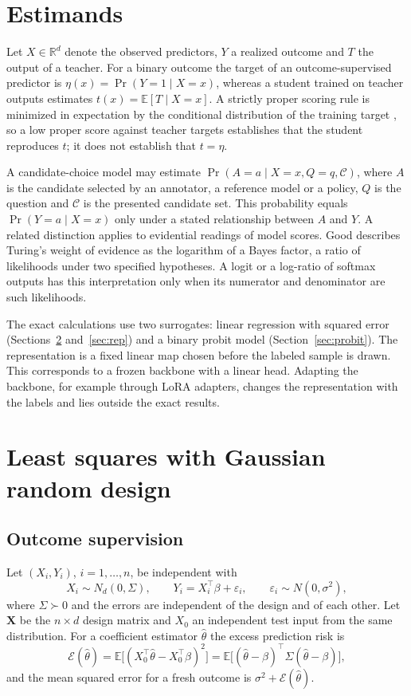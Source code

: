 \documentclass[11pt]{article}
\theoremstyle{remark}
\newcommand{\E}{\mathbb E}
\newcommand{\R}{\mathbb R}
\newcommand{\1}{\mathbf 1}
\begin{document}
\section{Estimands}\label{sec:estimands}
Let $X\in\R^d$ denote the observed predictors, $Y$ a realized outcome and $T$ the output of a teacher. For a binary outcome the target of an outcome-supervised predictor is $\eta(x)=\Pr(Y=1\mid X=x)$, whereas a student trained on teacher outputs estimates $t(x)=\E[T\mid X=x]$. A strictly proper scoring rule is minimized in expectation by the conditional distribution of the training target \cite{gneiting}, so a low proper score against teacher targets establishes that the student reproduces $t$; it does not establish that $t=\eta$.

A candidate-choice model may estimate $\Pr(A=a\mid X=x,Q=q,\mathcal C)$, where $A$ is the candidate selected by an annotator, a reference model or a policy, $Q$ is the question and $\mathcal C$ is the presented candidate set. This probability equals $\Pr(Y=a\mid X=x)$ only under a stated relationship between $A$ and $Y$. A related distinction applies to evidential readings of model scores. Good \cite{good} describes Turing's weight of evidence as the logarithm of a Bayes factor, a ratio of likelihoods under two specified hypotheses. A logit or a log-ratio of softmax outputs has this interpretation only when its numerator and denominator are such likelihoods.

The exact calculations use two surrogates: linear regression with squared error (Sections~\ref{sec:regression} and~\ref{sec:rep}) and a binary probit model (Section~\ref{sec:probit}). The representation is a fixed linear map chosen before the labeled sample is drawn. This corresponds to a frozen backbone with a linear head. Adapting the backbone, for example through LoRA adapters, changes the representation with the labels and lies outside the exact results.

\section{Least squares with Gaussian random design}\label{sec:regression}
\subsection{Outcome supervision}
Let $(X_i,Y_i)$, $i=1,\ldots,n$, be independent with
\begin{equation}\label{eq:dgp}
 X_i\sim N_d(0,\Sigma),\qquad Y_i=X_i^\top\beta+\varepsilon_i,
 \qquad \varepsilon_i\sim N(0,\sigma^2),
\end{equation}
where $\Sigma\succ0$ and the errors are independent of the design and of each other. Let $\mathbf X$ be the $n\times d$ design matrix and $X_0$ an independent test input from the same distribution. For a coefficient estimator $\widehat\theta$ the excess prediction risk is
\begin{equation}\label{eq:risk}
 \mathcal E(\widehat\theta)=\E\big[(X_0^\top\widehat\theta-X_0^\top\beta)^2\big]
 =\E\big[(\widehat\theta-\beta)^\top\Sigma(\widehat\theta-\beta)\big],
\end{equation}
and the mean squared error for a fresh outcome is $\sigma^2+\mathcal E(\widehat\theta)$.
\end{document}
